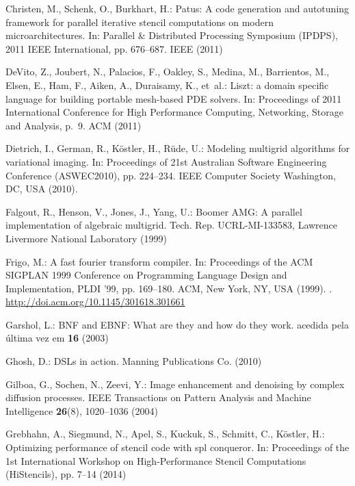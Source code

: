 \documentclass[onecolumn]{svjour3}
\begin{document}
\begin{thebibliography}{10}
Christen, M., Schenk, O., Burkhart, H.: Patus: A code generation and autotuning
  framework for parallel iterative stencil computations on modern
  microarchitectures.
\newblock In: Parallel \& Distributed Processing Symposium (IPDPS), 2011 IEEE
  International, pp. 676--687. IEEE (2011)

DeVito, Z., Joubert, N., Palacios, F., Oakley, S., Medina, M., Barrientos, M.,
  Elsen, E., Ham, F., Aiken, A., Duraisamy, K., et~al.: Liszt: a domain
  specific language for building portable mesh-based {PDE} solvers.
\newblock In: Proceedings of 2011 International Conference for High Performance
  Computing, Networking, Storage and Analysis, p.~9. ACM (2011)

Dietrich, I., German, R., K\"ostler, H., R\"ude, U.: Modeling multigrid
  algorithms for variational imaging.
\newblock In: Proceedings of 21st Australian Software Engineering Conference
  (ASWEC2010), pp. 224--234. IEEE Computer Society Washington, DC, USA (2010).
\newblock {}

Falgout, R., Henson, V., Jones, J., Yang, U.: Boomer {AMG}: {A} parallel
  implementation of algebraic multigrid.
\newblock Tech. Rep. UCRL-MI-133583, Lawrence Livermore National Laboratory
  (1999)

Frigo, M.: A fast fourier transform compiler.
\newblock In: Proceedings of the ACM SIGPLAN 1999 Conference on Programming
  Language Design and Implementation, PLDI '99, pp. 169--180. ACM, New York,
  NY, USA (1999).
\newblock {}.
\newblock \urlprefix\url{http://doi.acm.org/10.1145/301618.301661}

Garshol, L.: {BNF and EBNF: What are they and how do they work}.
\newblock acedida pela {\'u}ltima vez em \textbf{16} (2003)

Ghosh, D.: {DSLs in action}.
\newblock Manning Publications Co. (2010)

Gilboa, G., Sochen, N., Zeevi, Y.: {Image enhancement and denoising by complex
  diffusion processes}.
\newblock IEEE Transactions on Pattern Analysis and Machine Intelligence
  \textbf{26}(8), 1020--1036 (2004)

Grebhahn, A., Siegmund, N., Apel, S., Kuckuk, S., Schmitt, C., K\"ostler, H.:
  Optimizing performance of stencil code with spl conqueror.
\newblock In: Proceedings of the 1st International Workshop on High-Performance
  Stencil Computations (HiStencils), pp. 7--14 (2014)


\end{thebibliography}
\end{document}
